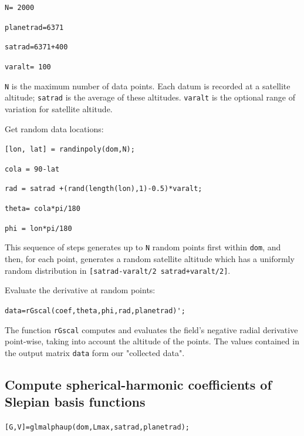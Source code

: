 \documentclass{article}
\begin{document}
\verb!N= 2000 ! 

\verb!planetrad=6371!

\verb!satrad=6371+400!

\verb!varalt= 100!

\setlength{\parskip}{0.5cm plus4mm minus3mm}

\verb!N! is the maximum number of data points. Each datum is recorded at a satellite altitude; \verb!satrad! is the average of these altitudes.  \verb!varalt! is the optional range of variation for satellite altitude.

\vspace{3mm}

Get random data locations:

\vspace{3mm}

\setlength{\parskip}{.1mm}

\verb![lon, lat] = randinpoly(dom,N);!

\verb!cola = 90-lat!

\verb!rad = satrad +(rand(length(lon),1)-0.5)*varalt;!

\verb!theta= cola*pi/180!

\verb!phi = lon*pi/180!

\setlength{\parskip}{0.5cm plus4mm minus3mm}

This sequence of steps generates up to \verb!N! random points first within \verb!dom!, and then, for each point, generates a random satellite altitude which has a uniformly random distribution in  \verb![satrad-varalt/2 satrad+varalt/2]!.

\vspace{3mm}

Evaluate the derivative at random points:

\verb!data=rGscal(coef,theta,phi,rad,planetrad)';!

\setlength{\parskip}{0.5cm plus4mm minus3mm}

The function \verb!rGscal! computes and evaluates the field's negative radial derivative point-wise, taking into account the altitude of the points. The values contained in the output matrix \verb!data! form our "collected data".


\subsection{Compute spherical-harmonic coefficients of Slepian basis functions}


\verb![G,V]=glmalphaup(dom,Lmax,satrad,planetrad);!
\end{document}
